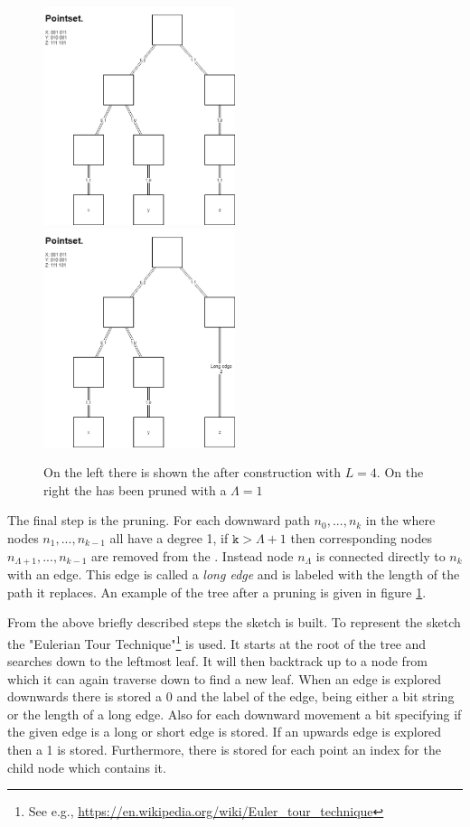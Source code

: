 \begin{figure}
	\includegraphics[width=0.5\textwidth]{figures/quadtree}
	\includegraphics[width=0.5\textwidth]{figures/prunnedquadtree}
	\caption{On the left there is shown the \qt{} after construction with $L=4$. On the right the \qt{} has been pruned with a $\Lambda = 1$}
	\label{fig:quadtree}
\end{figure}

The final step is the pruning. For each downward path $n_0,...,n_k$ in the \qt{} where nodes $n_1,...,n_{k-1}$ all have a degree 1, if \ensuremath{\texttt{k} > \Lambda+1} then corresponding nodes $n_{\Lambda+1},...,n_{k-1}$ are removed from the \qt{}. Instead node $n_{\Lambda}$ is connected directly to $n_{k}$ with an edge. This edge is called a \textit{long edge} and is labeled with the length of the path it replaces. An example of the tree after a pruning is given in figure \ref{fig:quadtree}.


From the above briefly described steps the sketch is built. To represent the sketch the "Eulerian Tour Technique"\footnote{See e.g., \url{https://en.wikipedia.org/wiki/Euler\_tour\_technique}} is used.
It starts at the root of the tree and searches down to the leftmost leaf. It will then backtrack up to a node from which it can again traverse down to find a new leaf. When an edge is explored downwards there is stored a 0 and the label of the edge, being either a bit string or the length of a long edge. Also for each downward movement a bit specifying if the given edge is a long or short edge is stored. If an upwards edge is explored then a 1 is stored. Furthermore, there is stored for each point an index for the child node which contains it.

